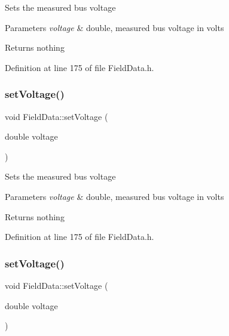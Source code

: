 Sets the measured bus voltage


\begin{DoxyParams}{Parameters}
{\em voltage} & double, measured bus voltage in volts\\
\hline
\end{DoxyParams}
\begin{DoxyReturn}{Returns}
nothing 
\end{DoxyReturn}


Definition at line 175 of file Field\+Data.\+h.

\mbox{\label{class_field_data_a02735cc6956a3fce97bab645ef15dabc}} 
\subsubsection{\texorpdfstring{set\+Voltage()}{setVoltage()}\hspace{0.1cm}{\footnotesize\ttfamily [2/3]}}
{\footnotesize\ttfamily void Field\+Data\+::set\+Voltage (\begin{DoxyParamCaption}\item[{double}]{voltage }\end{DoxyParamCaption})\hspace{0.3cm}{\ttfamily [inline]}}

Sets the measured bus voltage


\begin{DoxyParams}{Parameters}
{\em voltage} & double, measured bus voltage in volts\\
\hline
\end{DoxyParams}
\begin{DoxyReturn}{Returns}
nothing 
\end{DoxyReturn}


Definition at line 175 of file Field\+Data.\+h.

\mbox{\label{class_field_data_a02735cc6956a3fce97bab645ef15dabc}} 
\subsubsection{\texorpdfstring{set\+Voltage()}{setVoltage()}\hspace{0.1cm}{\footnotesize\ttfamily [3/3]}}
{\footnotesize\ttfamily void Field\+Data\+::set\+Voltage (\begin{DoxyParamCaption}\item[{double}]{voltage }\end{DoxyParamCaption})\hspace{0.3cm}{\ttfamily [inline]}}

